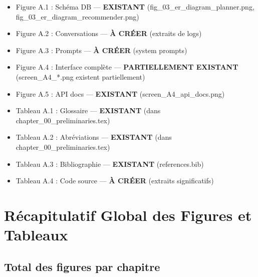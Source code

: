 \documentclass[12pt,a4paper]{article}
\begin{document}
\begin{itemize}
    \item[\textcolor{green}{\checkmark}] Figure A.1 : Schéma DB — \textbf{EXISTANT} (fig\_03\_er\_diagram\_planner.png, fig\_03\_er\_diagram\_recommender.png)
    \item[\textcolor{green}{\checkmark}] Figure A.2 : Conversations — \textbf{À CRÉER} (extraits de logs)
    \item[\textcolor{green}{\checkmark}] Figure A.3 : Prompts — \textbf{À CRÉER} (system prompts)
    \item[\textcolor{orange}{!}] Figure A.4 : Interface complète — \textbf{PARTIELLEMENT EXISTANT} (screen\_A4\_*.png existent partiellement)
    \item[\textcolor{green}{\checkmark}] Figure A.5 : API docs — \textbf{EXISTANT} (screen\_A4\_api\_docs.png)
    
    \item[\textcolor{green}{\checkmark}] Tableau A.1 : Glossaire — \textbf{EXISTANT} (dans chapter\_00\_preliminaries.tex)
    \item[\textcolor{green}{\checkmark}] Tableau A.2 : Abréviations — \textbf{EXISTANT} (dans chapter\_00\_preliminaries.tex)
    \item[\textcolor{green}{\checkmark}] Tableau A.3 : Bibliographie — \textbf{EXISTANT} (references.bib)
    \item[\textcolor{green}{\checkmark}] Tableau A.4 : Code source — \textbf{À CRÉER} (extraits significatifs)
\end{itemize}


\newpage
\section{Récapitulatif Global des Figures et Tableaux}

\subsection*{Total des figures par chapitre}
\end{document}
